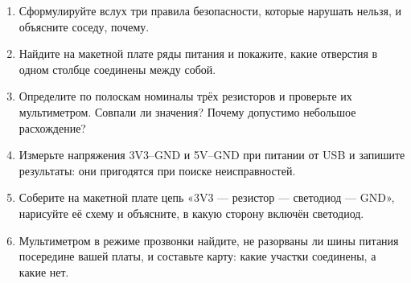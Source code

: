 \begin{tasks}
\begin{enumerate}
\item {} Сформулируйте вслух три правила безопасности, которые нарушать нельзя, и объясните соседу, почему.
\item {} Найдите на макетной плате ряды питания и покажите, какие отверстия в одном столбце соединены между собой.
\item {} Определите по полоскам номиналы трёх резисторов и проверьте их мультиметром. Совпали ли значения? Почему допустимо небольшое расхождение?
\item {} Измерьте напряжения 3V3--GND и 5V--GND при питании от USB и запишите результаты: они пригодятся при поиске неисправностей.
\item {} Соберите на макетной плате цепь «3V3 --- резистор --- светодиод --- GND», нарисуйте её схему и объясните, в какую сторону включён светодиод.
\item {} Мультиметром в режиме прозвонки найдите, не разорваны ли шины питания посередине вашей платы, и составьте карту: какие участки соединены, а какие нет.
\end{enumerate}
\end{tasks}
